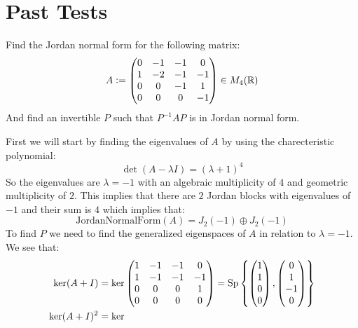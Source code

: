 \documentclass[11pt, a4paper]{article}
\begin{document}
\newpage
\section{Past Tests}

\begin{exercise}
  Find the Jordan normal form for the following matrix:
  \[
  A := \begin{pmatrix}
  0 & -1 & -1 & 0\\
  1 & -2 & -1 & -1\\
  0 & 0 & -1 & 1\\
  0 & 0 & 0 & -1\\
  \end{pmatrix} \in M_4(\mathbb{R})
  \]
  And find an invertible $P$ such that  $P^{-1}AP$ is in Jordan normal form.
\end{exercise}
\begin{solution}
  First we will start by finding the eigenvalues of $A$ by using the
  charecteristic polynomial:
  \[
    \det(A - \lambda I) = (\lambda + 1)^4
  \]
  So the eigenvalues are $\lambda = -1$ with an algebraic multiplicity of $4$
  and geometric multiplicity of $2$. This implies that there are $2$ Jordan
  blocks with eigenvalues of $-1$ and their sum is $4$ which implies that:
  \[
    \mathrm{JordanNormalForm}(A) = J_2(-1) \oplus J_2(-1)
  \]
  To find $P$ we need to find the generalized eigenspaces of $A$ in relation
  to $\lambda = -1$. We see that:
  \begin{align*}
    \ker(A+I) &= \ker
    \left(\begin{matrix}
    1 & -1 & -1 & 0 \\
    1 & -1 & -1 & -1 \\
    0 & 0 & 0 & 1 \\
    0 & 0 & 0 & 0
    \end{matrix}\right) = 
    \Sp\left\{
    \begin{pmatrix}
      1\\
      1\\
      0\\
      0\\
    \end{pmatrix},
    \begin{pmatrix}
      0\\
      1\\
      -1\\
      0\\
    \end{pmatrix}
    \right\} \\
    \ker(A+I)^2 &= \ker

\end{align*}
\end{solution}
\end{document}
